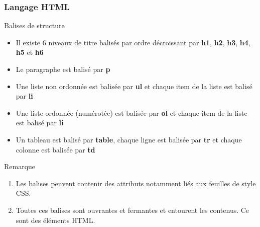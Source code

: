 \documentclass[8pt]{beamer}
\newcounter{num}
\begin{document}
\begin{frame}
\frametitle{Langage HTML}

\begin{block}{Balises de structure}
\begin{itemize}
\item Il existe 6 niveaux de titre balisés par ordre décroissant par \textbf{h1}, \textbf{h2}, \textbf{h3}, \textbf{h4}, \textbf{h5} et \textbf{h6}
\item Le paragraphe est balisé par \textbf{p}
\item Une liste non ordonnée est balisée par \textbf{ul} et chaque item de la liste est balisé par \textbf{li}
\item Une liste ordonnée (numérotée) est balisée par \textbf{ol} et chaque item de la liste est balisé par \textbf{li}
\item Un tableau est balisé par \textbf{table}, chaque ligne est balisée par \textbf{tr} et chaque colonne est balisée par \textbf{td}
\end{itemize}


\end{block}


\begin{alertblock}{Remarque}
\begin{enumerate}
\item Les balises peuvent contenir des attributs notamment liés aux feuilles de style CSS.
\item Toutes ces balises sont ouvrantes et fermantes et entourent les contenus. Ce sont des éléments HTML.
\end{enumerate}

\end{alertblock}

\end{frame}
\end{document}
